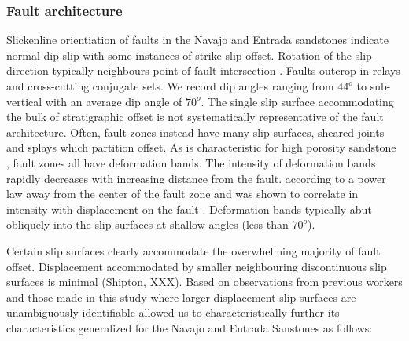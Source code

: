 \documentclass[12pt,a4paper]{article}
\begin{document}
\subsubsection{Fault architecture}

Slickenline orientiation of faults in the Navajo and Entrada sandstones indicate normal dip slip with some instances of strike slip offset. Rotation of the slip-direction typically neighbours point of fault intersection \cite{davatzes2003overprinting} \cite{maerten2001digital}. Faults outcrop in relays and cross-cutting conjugate sets. We record dip angles ranging from $44^o$ to sub-vertical with an average dip angle of $70^o$. The single slip surface accommodating the bulk of stratigraphic offset is not systematically representative of the fault architecture. Often, fault zones instead have many slip surfaces, sheared joints and splays which partition offset. As is characteristic for high porosity sandstone \cite{aydin1978development}, fault zones all have deformation bands. The intensity of deformation bands rapidly decreases with increasing distance from the fault. according to a power law away from the center of the fault zone and was shown to correlate in intensity with displacement on the fault . Deformation bands typically abut obliquely into the slip surfaces at shallow angles (less than $70^o$).

Certain slip surfaces clearly accommodate the overwhelming majority of fault offset. Displacement accommodated by smaller neighbouring discontinuous slip surfaces is minimal (Shipton, XXX). Based on observations from previous workers and those made in this study where larger displacement slip surfaces are unambiguously identifiable allowed us to characteristically further its characteristics generalized for the Navajo and Entrada Sanstones as follows:
\end{document}
